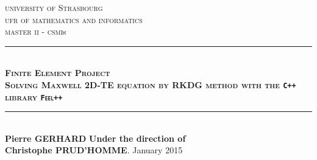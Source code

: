 
\begin{titlepage}
\newcommand{\HRule}{\rule{\linewidth}{0.5mm}}

\center
 
\textsc{\LARGE university of Strasbourg}\\[1.5cm]
\textsc{\Large ufr of mathematics and informatics }\\[0.5cm]  
\textsc{\Large master ii - csmi}s

\HRule \\

{ \textsc{\huge \bfseries Finite Element Project\\
Solving Maxwell 2D-TE equation by RKDG method with the \texttt{C++} library \texttt{Feel++}}}
\HRule \\
\vfill
\textbf{Pierre \textsc{GERHARD}}
\vfill
\textbf{Under the direction of}\\
\textbf{Christophe \textsc{PRUD'HOMME}}.
\vfill
{\large January 2015}\\[0cm]

\end{titlepage}
